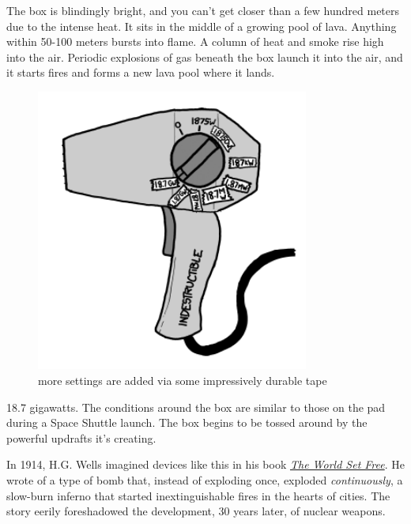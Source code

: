 {The box is blindingly bright, and you can’t get closer than a few hundred meters due to the intense heat. It sits in the middle of a growing pool of lava. Anything within 50-100 meters bursts into flame. A column of heat and smoke rise high into the air. Periodic explosions of gas beneath the box launch it into the air, and it starts fires and forms a new lava pool where it lands.}

\begin{figure}[!htbp]
\centering
\includegraphics[scale=0.5, max width=0.8\textwidth]{imgs/a/35/hair_dryer_18750000000.png}
\caption{more settings are added via some impressively durable tape}
\end{figure}

{18.7 gigawatts. The conditions around the box are similar to those on the pad during a Space Shuttle launch. The box begins to be tossed around by the powerful updrafts it’s creating.}

{In 1914, H.G. Wells imagined devices like this in his book \emph{ \href{http://en.wikipedia.org/wiki/The\_World\_Set\_Free}{The World Set Free}}. He wrote of a type of bomb that, instead of exploding once, exploded \emph{continuously}, a slow-burn inferno that started inextinguishable fires in the hearts of cities. The story eerily foreshadowed the development, 30 years later, of nuclear weapons.}

